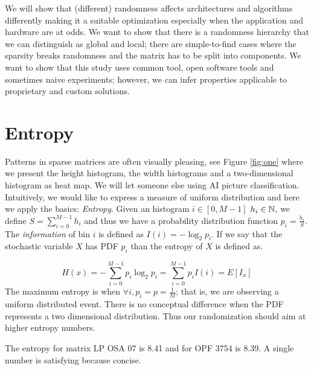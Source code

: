 \documentclass[manuscript,screen]{acmart}
\begin{document}
We will show that (different) randomness affects architectures and
algorithms differently making it a suitable optimization especially
when the application and hardware are at odds. We want to show that
there is a randomness hierarchy that we can distinguish as global and
local; there are simple-to-find cases where the sparsity breaks
randomness and the matrix has to be split into components.  We want to
show that this study uses common tool, open software tools and
sometimes naive experiments; however, we can infer properties
applicable to proprietary and custom solutions. 


\section{Entropy}
\label{sec:entropy}
Patterns in sparse matrices are often visually pleasing, see Figure
\ref{fig:one} where we present the height histogram, the width
histograms and a two-dimensional histogram as heat map. We will let
someone else using AI picture classification. Intuitively, we would
like to express a measure of uniform distribution and here we apply
the basics: {\em Entropy}. Given an histogram $i\in[0,M-1]$ $h_i \in
\mathbb{N}$, we define $S =\sum_{i=0}^{M-1}h_i$ and thus we have a probability
distribution function $p_i = \frac{h_i}{S}$. The {\em information} of
bin $i$ is defined as $I(i) = -\log_2 p_i$. If we say that the
stochastic variable $X$ has PDF $p_i$ than the entropy of $X$ is
defined as.

\begin{equation}
  \label{eq:entropy}
  H(x) = -\sum_{i=0}^{M-1} p_i\log_2p_i = \sum_{i=0}^{M-1}p_i I(i) =
  E[I_x]
\end{equation}
The maximum entropy is when $\forall i, p_i = p = \frac{1}{M}$; that
is, we are observing a uniform distributed event. There is no
conceptual difference when the PDF represents a two dimensional
distribution. Thus our randomization should aim at higher entropy
numbers.

The entropy for matrix LP OSA 07 is 8.41 and for OPF 3754 is 8.39. A
single number is satisfying because concise.  
\end{document}
